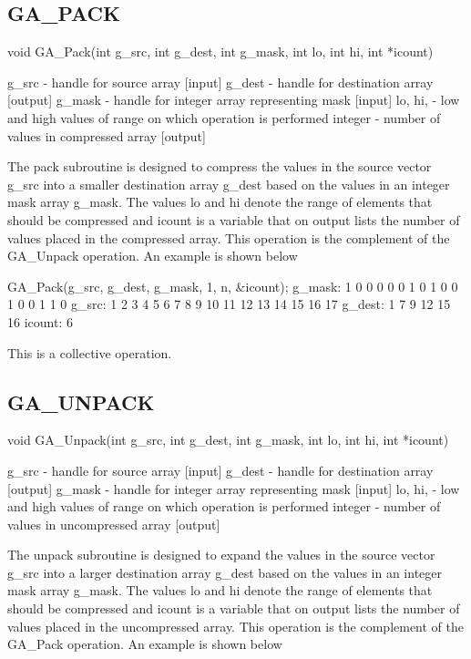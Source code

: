 \subsection*{GA\_PACK}

void GA\_Pack(int g\_src, int g\_dest, int g\_mask, int lo, int hi,
int {*}icount)

g\_src - handle for source array {[}input{]} g\_dest - handle for
destination array {[}output{]} g\_mask - handle for integer array
representing mask {[}input{]} lo, hi, - low and high values of range
on which operation is performed integer - number of values in compressed
array {[}output{]}

The pack subroutine is designed to compress the values in the source
vector g\_src into a smaller destination array g\_dest based on the
values in an integer mask array g\_mask. The values lo and hi denote
the range of elements that should be compressed and icount is a variable
that on output lists the number of values placed in the compressed
array. This operation is the complement of the GA\_Unpack operation.
An example is shown below

GA\_Pack(g\_src, g\_dest, g\_mask, 1, n, \&icount); g\_mask: 1 0 0
0 0 0 1 0 1 0 0 1 0 0 1 1 0 g\_src: 1 2 3 4 5 6 7 8 9 10 11 12 13
14 15 16 17 g\_dest: 1 7 9 12 15 16 icount: 6

This is a collective operation. 


\subsection*{GA\_UNPACK}

void GA\_Unpack(int g\_src, int g\_dest, int g\_mask, int lo, int
hi, int {*}icount)

g\_src - handle for source array {[}input{]} g\_dest - handle for
destination array {[}output{]} g\_mask - handle for integer array
representing mask {[}input{]} lo, hi, - low and high values of range
on which operation is performed integer - number of values in uncompressed
array {[}output{]}

The unpack subroutine is designed to expand the values in the source
vector g\_src into a larger destination array g\_dest based on the
values in an integer mask array g\_mask. The values lo and hi denote
the range of elements that should be compressed and icount is a variable
that on output lists the number of values placed in the uncompressed
array. This operation is the complement of the GA\_Pack operation.
An example is shown below


